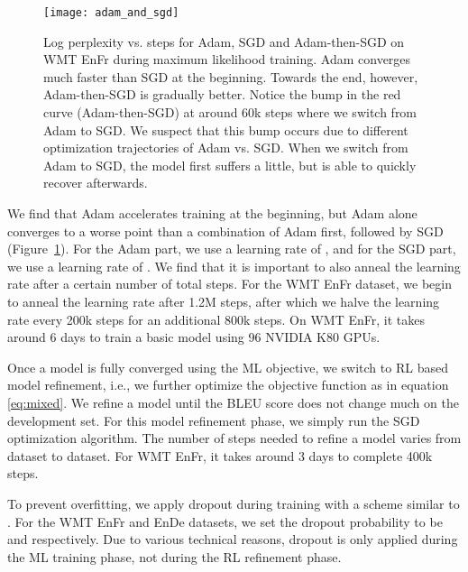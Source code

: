 \begin{figure}[h!]
\begin{center}
\centerline{\texttt{[image: adam\_and\_sgd]}}
	\caption{Log perplexity vs. steps for Adam, SGD and
          Adam-then-SGD on WMT EnFr during maximum
          likelihood training.  Adam converges much faster than SGD at
          the beginning.  Towards the end, however, Adam-then-SGD is
          gradually better. Notice the bump in the red curve
          (Adam-then-SGD) at around 60k steps where we switch from
          Adam to SGD.  We suspect that this bump occurs due to
          different optimization trajectories of Adam vs. SGD. When we
          switch from Adam to SGD, the model first suffers a little,
          but is able to quickly recover afterwards.}
\label{sgd_adam}
\end{center}
\end{figure}

We find that Adam accelerates training at the beginning, but Adam
alone converges to a worse point than a combination of Adam first, followed by 
SGD (Figure~\ref{sgd_adam}). For the Adam part, we use a learning
rate of , and for the SGD part, we use a learning rate of
. We find that it is important to also anneal the learning rate
after a certain number of total steps. For the WMT EnFr dataset, 
we begin
to anneal the learning rate after 1.2M steps, after which we halve the
learning rate every 200k steps for an additional 800k steps. On WMT
EnFr, it takes around 6 days to train a basic model using 96 NVIDIA K80 GPUs.






Once a model is fully converged using the ML objective, we switch to RL
based model refinement, i.e., we further optimize the objective
function as in equation \ref{eq:mixed}. We refine a model until the BLEU
score does not change much on the development set.  For this model
refinement phase, we simply run the SGD optimization algorithm. The number
of steps needed to refine a model varies from dataset to dataset. For
WMT EnFr, it takes around 3 days to complete 400k steps. 

To prevent overfitting, we apply dropout during training with a scheme similar
to \cite{lstm_dropout}. For the WMT EnFr and EnDe datasets, we set the
dropout probability to be  and  respectively. Due to various technical reasons, dropout is
only applied during the ML training phase, not during the RL refinement phase.

